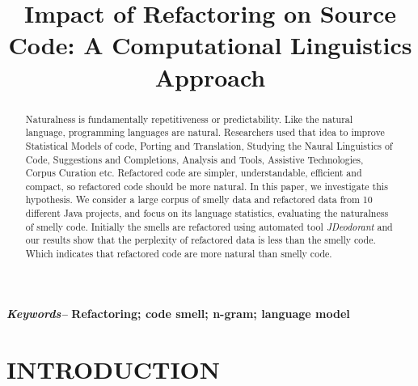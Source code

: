 \documentclass[conference]{IEEEtran}
\providecommand{\keywords}[1]{\textbf{\textit{Keywords--}} #1}
\begin{document}
%
\title{Impact of Refactoring on Source Code: A Computational Linguistics Approach}


\author{}

\maketitle

\begin{abstract}
Naturalness is fundamentally repetitiveness or predictability.  Like the natural language, programming languages are natural. Researchers used that idea to improve 
Statistical Models of code, Porting and Translation, Studying the Naural Linguistics of Code, Suggestions and Completions, Analysis and Tools, Assistive Technologies, Corpus Curation etc. Refactored code are simpler, understandable, efficient and compact, so refactored code should be more natural. In this paper, we investigate this hypothesis. We consider a large corpus of smelly data and refactored data from 10 different Java projects, and focus on its language statistics, evaluating the naturalness of smelly code. Initially the smells are refactored using automated tool \textit{JDeodorant} and our results show that the perplexity of refactored data is less than the smelly code. Which indicates that refactored code are more natural than smelly code.
\end{abstract}

\keywords{\textbf{Refactoring; code smell; n-gram; language model}}


%
\IEEEpeerreviewmaketitle



\section{INTRODUCTION} \label{Intro}
\end{document}
